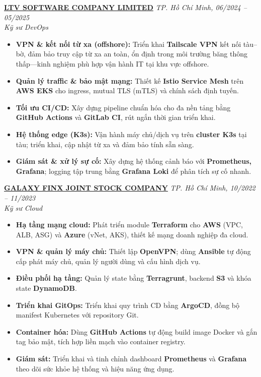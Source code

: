 \documentclass[a4paper,10pt]{article}
\begin{document}
\vspace{10pt}
\noindent \textbf{\href{https://www.linkedin.com/company/ltvofficial/posts/?feedView=all}{LTV SOFTWARE COMPANY LIMITED}} \hfill \textit{TP. Hồ Chí Minh, 06/2024 -- 05/2025}  \\
\textit{Kỹ sư DevOps} \\
\begin{itemize}[leftmargin=*, itemsep=2pt]
    \item \textbf{VPN \& kết nối từ xa (offshore):} Triển khai \textbf{Tailscale VPN} kết nối tàu--bờ, đảm bảo truy cập từ xa an toàn, ổn định trong môi trường băng thông thấp---kinh nghiệm phù hợp vận hành IT tại khu vực offshore.
    \item \textbf{Quản lý traffic \& bảo mật mạng:} Thiết kế \textbf{Istio Service Mesh} trên \textbf{AWS EKS} cho ingress, mutual TLS (mTLS) và chính sách định tuyến.
    \item \textbf{Tối ưu CI/CD:} Xây dựng pipeline chuẩn hóa cho đa nền tảng bằng \textbf{GitHub Actions} và \textbf{GitLab CI}, rút ngắn thời gian triển khai.
    \item \textbf{Hệ thống edge (K3s):} Vận hành máy chủ/dịch vụ trên \textbf{cluster K3s} tại tàu; triển khai, cập nhật từ xa và đảm bảo tính sẵn sàng.
    \item \textbf{Giám sát \& xử lý sự cố:} Xây dựng hệ thống cảnh báo với \textbf{Prometheus, Grafana}; logging tập trung bằng \textbf{Grafana Loki} để phân tích sự cố nhanh.
\end{itemize}

\vspace{10pt}
\noindent \textbf{\href{https://www.linkedin.com/company/galaxy-finx/posts/?feedView=all}{GALAXY FINX JOINT STOCK COMPANY}} \hfill \textit{TP. Hồ Chí Minh, 10/2022 -- 11/2023} \\
\textit{Kỹ sư Cloud} \\
\begin{itemize}[leftmargin=*, itemsep=2pt]
    \item \textbf{Hạ tầng mạng cloud:} Phát triển module \textbf{Terraform} cho \textbf{AWS} (VPC, ALB, ASG) và \textbf{Azure} (vNet, AKS), thiết kế mạng doanh nghiệp đa cloud.
    \item \textbf{VPN \& quản lý máy chủ:} Thiết lập \textbf{OpenVPN}; dùng \textbf{Ansible} tự động cấp phát máy chủ, quản lý người dùng và cấu hình dịch vụ.
    \item \textbf{Điều phối hạ tầng:} Quản lý state bằng \textbf{Terragrunt}, backend \textbf{S3} và khóa state \textbf{DynamoDB}.
    \item \textbf{Triển khai GitOps:} Triển khai quy trình CD bằng \textbf{ArgoCD}, đồng bộ manifest Kubernetes với repository Git.
    \item \textbf{Container hóa:} Dùng \textbf{GitHub Actions} tự động build image Docker và gắn tag bảo mật, tích hợp liền mạch vào container registry.
    \item \textbf{Giám sát:} Triển khai và tinh chỉnh dashboard \textbf{Prometheus} và \textbf{Grafana} theo dõi sức khỏe hệ thống và hiệu năng ứng dụng.
\end{itemize}
\end{document}
